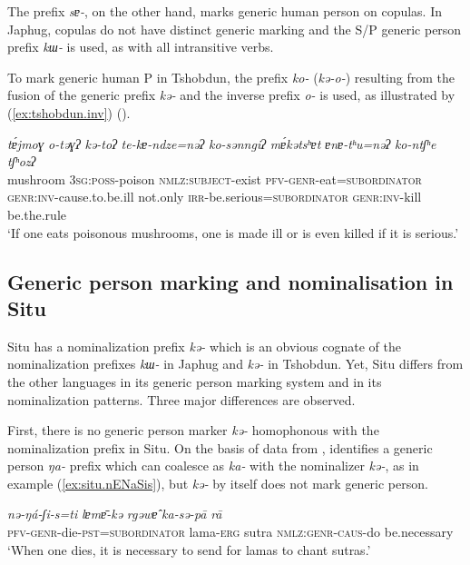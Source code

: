 \documentclass[oneside,a4paper,11pt]{article}
\newcommand{\ipa}[1]{\textit{\phon\mbox{#1}}} %
\newcommand{\refb}[1]{(\ref{#1})}
\begin{document}
 The prefix \ipa{sɐ-}, on the other hand, marks generic human person on copulas. In Japhug, copulas do not have distinct generic marking and the S/P generic person prefix \ipa{kɯ-} is used, as with all intransitive verbs.
 
To mark generic human P in Tshobdun, the prefix \ipa{ko-} (\ipa{kə-o-}) resulting from the  fusion  of  the generic prefix \ipa{kə-} and the inverse prefix \ipa{o-} is used, as illustrated by \refb{ex:tshobdun.inv} (\citealt[240]{sun14generic}).

 \begin{exe}
\ex \label{ex:tshobdun.inv}
\gll
\ipa{tɐ́jmoɣ}  	\ipa{o-təɣʔ}  	\ipa{kə-toʔ}  	\ipa{te-kɐ-ndze=nəʔ}  	\ipa{ko-sənngiʔ}  	\ipa{mɐ́kətsʰɐt}  	\ipa{ɐnɐ-tʰu=nəʔ}  	\ipa{ko-ntʃʰe}  	\ipa{tʃʰozʔ}  \\
 mushroom \textsc{3sg:poss}-poison \textsc{nmlz:subject}-exist \textsc{pfv-genr}-eat=\textsc{subordinator}  \textsc{genr:inv}-cause.to.be.ill not.only \textsc{irr}-be.serious=\textsc{subordinator}   \textsc{genr:inv}-kill be.the.rule \\
\glt ‘If one eats poisonous mushrooms, one is made ill or is even killed if it is serious.’ 
 \end{exe}
 
 
\subsection{Generic person marking and nominalisation in Situ} \label{situ.nmlz}

   Situ has a nominalization prefix \ipa{kə-} which is an obvious cognate of the  nominalization prefixes \ipa{kɯ-} in Japhug and \ipa{kə-} in Tshobdun. Yet, Situ differs from the other languages in its generic person marking system and in its nominalization patterns. Three major differences are observed.

First, there is no generic person  marker \ipa{kə-} homophonous with the nominalization prefix in Situ.  On the basis of data from \citet[47-9]{wei01ka}, \citet[243-4]{sun14generic} identifies a generic person \ipa{ŋa-} prefix which can coalesce as \ipa{ka-} with the nominalizer \ipa{kə-}, as in example \refb{ex:situ.nENaSis}, but \ipa{kə-} by itself does not mark generic person. 

 \begin{exe}
\ex \label{ex:situ.nENaSis}
\gll
\ipa{nə-ŋá-ʃi-s=ti}  	\ipa{lɐmɐ̄-kə}  	\ipa{rgəwɐ̂}  	\ipa{ka-sə-pā}  	\ipa{rā}  \\
\textsc{pfv-genr}-die-\textsc{pst=subordinator} lama-\textsc{erg} sutra \textsc{nmlz:genr-caus}-do be.necessary \\
\glt `When one dies, it is necessary to send for lamas to chant sutras.'
  \end{exe}
 
\end{document}
